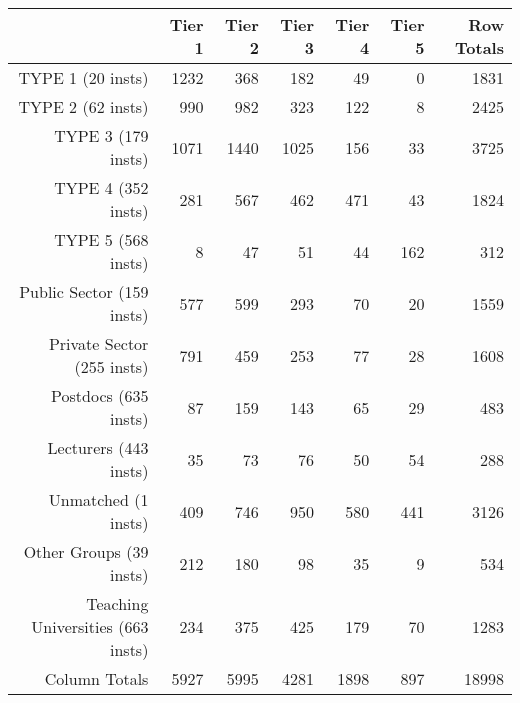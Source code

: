 \begin{tabular}{rrrrrrr}
  \hline
   & \textbf{Tier 1} & \textbf{Tier 2} & \textbf{Tier 3} & \textbf{Tier 4} & \textbf{Tier 5} & \textbf{Row Totals} \\\hline
  TYPE 1 (20 insts) & 1232 & 368 & 182 & 49 & 0 & 1831 \\
  TYPE 2 (62 insts) & 990 & 982 & 323 & 122 & 8 & 2425 \\
  TYPE 3 (179 insts) & 1071 & 1440 & 1025 & 156 & 33 & 3725 \\
  TYPE 4 (352 insts) & 281 & 567 & 462 & 471 & 43 & 1824 \\
  TYPE 5 (568 insts) & 8 & 47 & 51 & 44 & 162 & 312 \\
  Public Sector (159 insts) & 577 & 599 & 293 & 70 & 20 & 1559 \\
  Private Sector (255 insts) & 791 & 459 & 253 & 77 & 28 & 1608 \\
  Postdocs (635 insts) & 87 & 159 & 143 & 65 & 29 & 483 \\
  Lecturers (443 insts) & 35 & 73 & 76 & 50 & 54 & 288 \\
  Unmatched (1 insts) & 409 & 746 & 950 & 580 & 441 & 3126 \\
  Other Groups (39 insts) & 212 & 180 & 98 & 35 & 9 & 534 \\
  Teaching Universities (663 insts) & 234 & 375 & 425 & 179 & 70 & 1283 \\
  Column Totals & 5927 & 5995 & 4281 & 1898 & 897 & 18998 \\\hline
\end{tabular}
